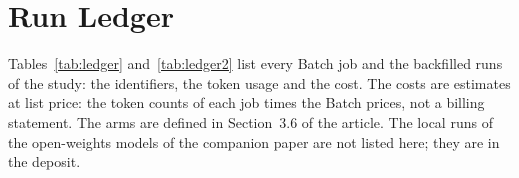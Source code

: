 \section{Run Ledger}
\label{sup:ledger}

Tables~\ref{tab:ledger} and~\ref{tab:ledger2} list every Batch job and the backfilled runs of the study: the identifiers, the token usage and the cost. The costs are estimates at list price: the token counts of each job times the Batch prices, not a billing statement. The arms are defined in Section~3.6 of the article. The local runs of the open-weights models of the companion paper are not listed here; they are in the deposit.

